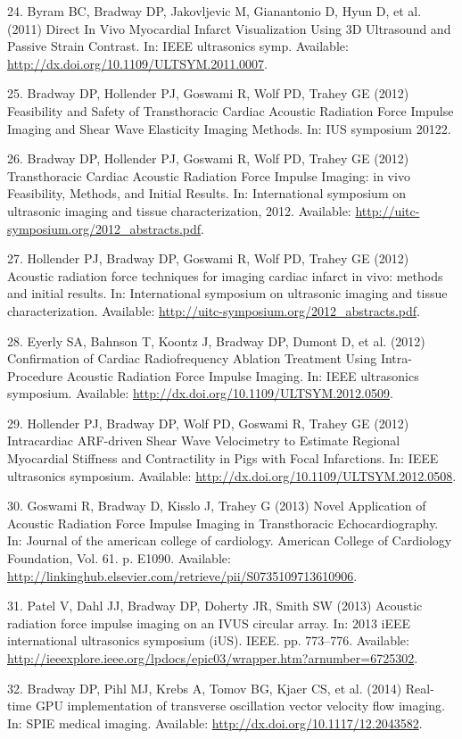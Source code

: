 \documentclass[]{article}
\begin{document}
24. Byram BC, Bradway DP, Jakovljevic M, Gianantonio D, Hyun D, et al.
(2011) Direct In Vivo Myocardial Infarct Visualization Using 3D
Ultrasound and Passive Strain Contrast. In: IEEE ultrasonics symp.
Available: \url{http://dx.doi.org/10.1109/ULTSYM.2011.0007}.

25. Bradway DP, Hollender PJ, Goswami R, Wolf PD, Trahey GE (2012)
Feasibility and Safety of Transthoracic Cardiac Acoustic Radiation Force
Impulse Imaging and Shear Wave Elasticity Imaging Methods. In: IUS
symposium 20122.

26. Bradway DP, Hollender PJ, Goswami R, Wolf PD, Trahey GE (2012)
Transthoracic Cardiac Acoustic Radiation Force Impulse Imaging: in vivo
Feasibility, Methods, and Initial Results. In: International symposium
on ultrasonic imaging and tissue characterization, 2012. Available:
\url{http://uitc-symposium.org/2012_abstracts.pdf}.

27. Hollender PJ, Bradway DP, Goswami R, Wolf PD, Trahey GE (2012)
Acoustic radiation force techniques for imaging cardiac infarct in vivo:
methods and initial results. In: International symposium on ultrasonic
imaging and tissue characterization. Available:
\url{http://uitc-symposium.org/2012_abstracts.pdf}.

28. Eyerly SA, Bahnson T, Koontz J, Bradway DP, Dumont D, et al. (2012)
Confirmation of Cardiac Radiofrequency Ablation Treatment Using
Intra-Procedure Acoustic Radiation Force Impulse Imaging. In: IEEE
ultrasonics symposium. Available:
\url{http://dx.doi.org/10.1109/ULTSYM.2012.0509}.

29. Hollender PJ, Bradway DP, Wolf PD, Goswami R, Trahey GE (2012)
Intracardiac ARF-driven Shear Wave Velocimetry to Estimate Regional
Myocardial Stiffness and Contractility in Pigs with Focal Infarctions.
In: IEEE ultrasonics symposium. Available:
\url{http://dx.doi.org/10.1109/ULTSYM.2012.0508}.

30. Goswami R, Bradway D, Kisslo J, Trahey G (2013) Novel Application of
Acoustic Radiation Force Impulse Imaging in Transthoracic
Echocardiography. In: Journal of the american college of cardiology.
American College of Cardiology Foundation, Vol. 61. p. E1090. Available:
\url{http://linkinghub.elsevier.com/retrieve/pii/S0735109713610906}.

31. Patel V, Dahl JJ, Bradway DP, Doherty JR, Smith SW (2013) Acoustic
radiation force impulse imaging on an IVUS circular array. In: 2013 iEEE
international ultrasonics symposium (iUS). IEEE. pp. 773--776.
Available:
\url{http://ieeexplore.ieee.org/lpdocs/epic03/wrapper.htm?arnumber=6725302}.

32. Bradway DP, Pihl MJ, Krebs A, Tomov BG, Kjaer CS, et al. (2014)
Real-time GPU implementation of transverse oscillation vector velocity
flow imaging. In: SPIE medical imaging. Available:
\url{http://dx.doi.org/10.1117/12.2043582}.
\end{document}
